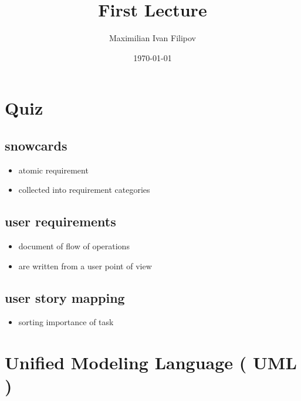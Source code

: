 \documentclass[11pt]{article}
\author{Maximilian Ivan Filipov}
\date{\today}
\title{First Lecture}
\begin{document}
\maketitle
\tableofcontents



\section{Quiz}
\label{sec:orgc593d3e}
\vspace*{0.5cm}
\subsection{snowcards}
\label{sec:orgcb7115b}
\begin{itemize}
\item atomic requirement
\item collected into requirement categories
\end{itemize}
\subsection{user requirements}
\label{sec:orgd43cf2a}
\begin{itemize}
\item document of flow of operations
\item are written from a user point of view
\end{itemize}
\subsection{user story mapping}
\label{sec:org7679fe7}
\begin{itemize}
\item sorting importance of task
\end{itemize}
\pagebreak
\vspace*{-4cm}
\section{Unified Modeling Language ( UML )}
\label{sec:org3fd1a16}
\end{document}
